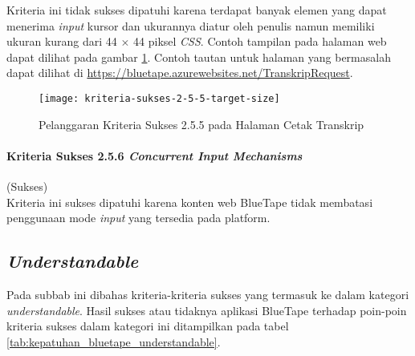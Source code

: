 Kriteria ini tidak sukses dipatuhi karena terdapat banyak elemen yang dapat menerima \textit{input} kursor dan ukurannya diatur oleh penulis namun memiliki ukuran kurang dari 44 $\times$ 44 piksel \textit{CSS}. Contoh tampilan pada halaman web dapat dilihat pada gambar \ref{fig:2.5.5_target_size}. Contoh tautan untuk halaman yang bermasalah dapat dilihat di \url{https://bluetape.azurewebsites.net/TranskripRequest}.

\begin{figure}[H]
    \centering  
    \texttt{[image: kriteria-sukses-2-5-5-target-size]}  
    \caption[Pelanggaran Kriteria Sukses 2.5.5 pada Halaman Cetak Transkrip]{Pelanggaran Kriteria Sukses 2.5.5 pada Halaman Cetak Transkrip}
    \label{fig:2.5.5_target_size}  
\end{figure} 

\paragraph{Kriteria Sukses 2.5.6 \textit{Concurrent Input Mechanisms}}
\label{par:kepatuhan_bluetape_kriteria_sukses_2.5.6}
(Sukses)\\

Kriteria ini sukses dipatuhi karena konten web BlueTape tidak membatasi penggunaan mode \textit{input} yang tersedia pada platform.

\subsection{\textit{Understandable}}
\label{subsec:kepatuhan_bluetape_understandable}
Pada subbab ini dibahas kriteria-kriteria sukses yang termasuk ke dalam kategori \textit{understandable}. Hasil sukses atau tidaknya aplikasi BlueTape terhadap poin-poin kriteria sukses dalam kategori ini ditampilkan pada tabel \ref{tab:kepatuhan_bluetape_understandable}.

